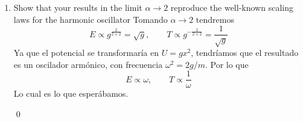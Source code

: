 \documentclass[]{article}
\numberwithin{equation}{section}
\begin{document}
\begin{enumerate}
 	\qed
 	
 	\item[iii.] Show that your results in the limit $\alpha \to 2$ reproduce the well-known scaling laws for the harmonic oscillator
 	\resp Tomando $\alpha\to 2$ tendremos
 	\begin{equation}
 		E \propto g^{\frac{2}{2 +2}} = \sqrt{g}, \qquad T \propto g^{-\frac{2}{2 +2}} = \frac{1}{\sqrt{g}}
 	\end{equation}
 	Ya que el potencial se transformaría en $U = g x^2$, tendríamos que el resultado es un oscilador armónico, con frecuencia $\omega^2 = 2g/m$. Por lo que
 	\begin{equation}
 		E \propto \omega, \qquad T \propto \frac{1}{\omega}
 	\end{equation}
 	Lo cual es lo que esperábamos.
 	
 	\qed
 	
 \end{enumerate}
\end{document}
